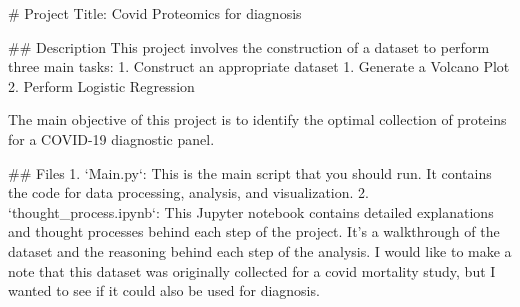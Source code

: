 # Project Title: Covid Proteomics for diagnosis

## Description
This project involves the construction of a dataset to perform three main tasks:
1. Construct an appropriate dataset
1. Generate a Volcano Plot
2. Perform Logistic Regression

The main objective of this project is to identify the optimal collection of proteins for a COVID-19 diagnostic panel.

## Files
1. `Main.py`: This is the main script that you should run. It contains the code for data processing, analysis, and visualization.
2. `thought_process.ipynb`: This Jupyter notebook contains detailed explanations and thought processes behind each step of the project. It's a walkthrough of the dataset and the reasoning behind each step of the analysis. I would like to make a note that this dataset was originally collected for a covid mortality study, but I wanted to see if it could also be used for diagnosis.